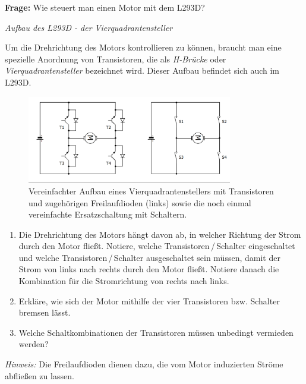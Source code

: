 \begin{ziel}
	\textbf{Frage:} Wie steuert man einen Motor mit dem L293D? 
\end{ziel}

\begin{aufgabe} \emph{Aufbau des L293D - der Vierquadrantensteller}
	
	Um die Drehrichtung des Motors kontrollieren zu können, braucht man eine spezielle Anordnung von Transistoren, die als \emph{H-Brücke} oder \emph{Vierquadrantensteller} bezeichnet wird. Dieser Aufbau befindet sich auch im L293D.
	
	\begin{figure}[H]
		\centering
		\includegraphics[width=0.8\textwidth]{./Zeichnungen/vierquadrantensteller.png}
		\caption{Vereinfachter Aufbau eines Vierquadrantenstellers mit Transistoren und zugehörigen Freilaufdioden (links) sowie die noch einmal vereinfachte Ersatzschaltung mit Schaltern.}
	\end{figure}
	
	\begin{enumerate}[label=\alph*), itemsep=0mm, parsep=0mm]
		\item Die Drehrichtung des Motors hängt davon ab, in welcher Richtung der Strom durch den Motor fließt. Notiere, welche Transistoren\,/\,Schalter eingeschaltet und welche Transistoren\,/\,Schalter ausgeschaltet sein müssen, damit der Strom von links nach rechts durch den Motor fließt. Notiere danach die Kombination für die Stromrichtung von rechts nach links.
		\item Erkläre, wie sich der Motor mithilfe der vier Transistoren bzw. Schalter bremsen lässt.
		\item Welche Schaltkombinationen der Transistoren müssen unbedingt vermieden werden?
	\end{enumerate}
	
	\emph{Hinweis:} Die Freilaufdioden dienen dazu, die vom Motor induzierten Ströme abfließen zu lassen.
\end{aufgabe}

